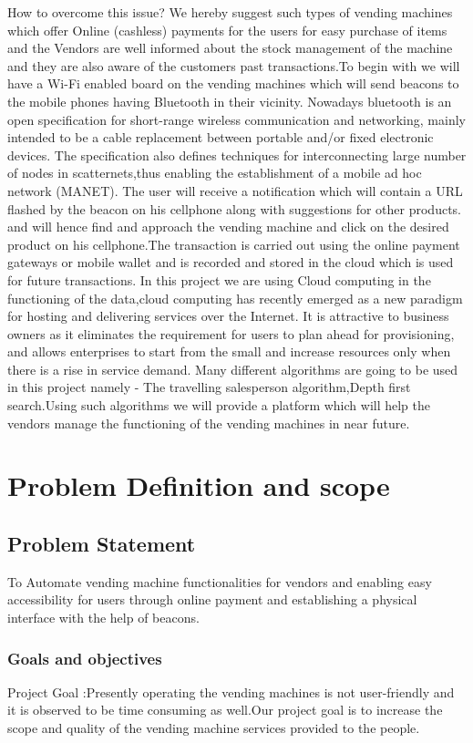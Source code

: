 \documentclass[oneside,a4paper,12pt]{report}
\begin{document}
How to overcome this issue?
 We hereby suggest such types of vending machines which offer Online (cashless) payments for the users for easy purchase of items and the Vendors are well informed about the stock management of the machine and they are also aware of the customers past transactions.To begin with we will have a Wi-Fi enabled board on the vending machines which will send beacons to the mobile phones having Bluetooth in their vicinity.
Nowadays bluetooth is an open specification for short-range wireless communication and networking, mainly intended to be a cable replacement between portable and/or fixed electronic devices. The specification also defines techniques for interconnecting large number of nodes in scatternets,thus enabling the establishment of a mobile ad hoc network (MANET).
The user will receive a notification which will contain a URL flashed by the beacon on his cellphone along with suggestions for other products.
and will hence find and approach the vending machine and click on the desired product on his cellphone.The transaction is carried out using the online payment gateways or mobile wallet and is recorded and stored in the cloud which is used for future transactions.
In this project we are using Cloud computing in the functioning of the data,cloud computing has recently emerged as a new
paradigm for hosting and delivering services over the Internet. It is attractive to business owners as it eliminates the requirement for users to plan ahead for provisioning, and allows enterprises to start from the small and increase resources only when there is a rise in service demand.
Many different algorithms are going to be used in this project namely - The travelling salesperson algorithm,Depth first search.Using such algorithms we will provide a platform which will help the vendors manage the functioning of the vending machines in near future.


\chapter{Problem Definition and scope}
\section{Problem Statement}
 To Automate vending machine functionalities for vendors and enabling easy accessibility for users through online payment and establishing a physical interface with the help of beacons. 


\subsection{Goals and objectives}  
Project Goal :Presently operating the vending machines is not user-friendly and it is observed to be time consuming as well.Our project goal is to increase the scope and quality of the vending machine services provided to the people. 
\end{document}
